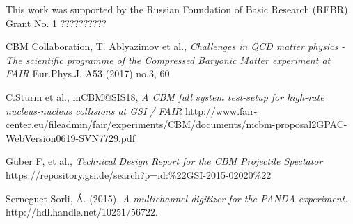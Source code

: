 \documentclass[a4paper,11pt]{article}
\begin{document}
\acknowledgments
This work was supported by the Russian Foundation of Basic Research (RFBR) Grant No. 1 ??????????



\begin{thebibliography}{99}


CBM Collaboration, T. Ablyazimov et al., \emph{Challenges in QCD matter physics -The scientific programme of the Compressed Baryonic Matter experiment at FAIR} Eur.Phys.J. A53 (2017) no.3, 60 


C.Sturm et al., mCBM@SIS18, \emph{A CBM full system test-setup for high-rate nucleus-nucleus collisions at GSI / FAIR} http://www.fair-center.eu/fileadmin/fair/experiments/CBM/documents/mcbm-proposal2GPAC-WebVersion0619-SVN7729.pdf

Guber F, et al., \emph{Technical Design Report for the CBM Projectile Spectator} https://repository.gsi.de/search?p=id:\%22GSI-2015-02020\%22

Serneguet Sorli, Á. (2015). \emph{A multichannel digitizer for the PANDA experiment.} http://hdl.handle.net/10251/56722.



\end{thebibliography}
\end{document}

